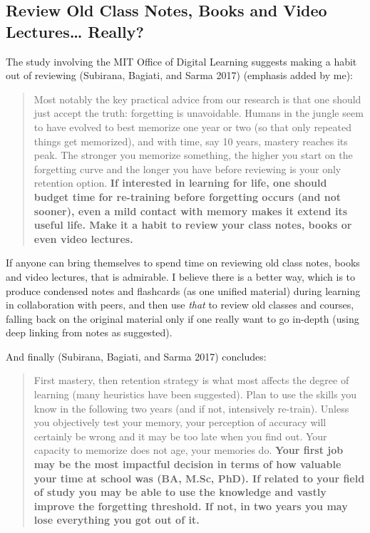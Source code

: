 \subsection{Review Old Class Notes, Books and Video Lectures\ldots{}
Really?}\label{review-old-class-notes-books-and-video-lectures-really}

The study involving the MIT Office of Digital Learning suggests making a
habit out of reviewing (Subirana, Bagiati, and Sarma 2017) (emphasis
added by me):

\begin{quote}
Most notably the key practical advice from our research is that one
should just accept the truth: forgetting is unavoidable. Humans in the
jungle seem to have evolved to best memorize one year or two (so that
only repeated things get memorized), and with time, say 10 years,
mastery reaches its peak. The stronger you memorize something, the
higher you start on the forgetting curve and the longer you have before
reviewing is your only retention option. \textbf{If interested in
learning for life, one should budget time for re-training before
forgetting occurs (and not sooner), even a mild contact with memory
makes it extend its useful life. Make it a habit to review your class
notes, books or even video lectures.}
\end{quote}

If anyone can bring themselves to spend time on reviewing old class
notes, books and video lectures, that is admirable. I believe there is a
better way, which is to produce condensed notes and flashcards (as one
unified material) during learning in collaboration with peers, and then
use \emph{that} to review old classes and courses, falling back on the
original material only if one really want to go in-depth (using deep
linking from notes as suggested).

And finally (Subirana, Bagiati, and Sarma 2017) concludes:

\begin{quote}
First mastery, then retention strategy is what most affects the degree
of learning (many heuristics have been suggested). Plan to use the
skills you know in the following two years (and if not, intensively
re-train). Unless you objectively test your memory, your perception of
accuracy will certainly be wrong and it may be too late when you find
out. Your capacity to memorize does not age, your memories do.
\textbf{Your first job may be the most impactful decision in terms of
how valuable your time at school was (BA, M.Sc, PhD). If related to your
field of study you may be able to use the knowledge and vastly improve
the forgetting threshold. If not, in two years you may lose everything
you got out of it.}
\end{quote}

